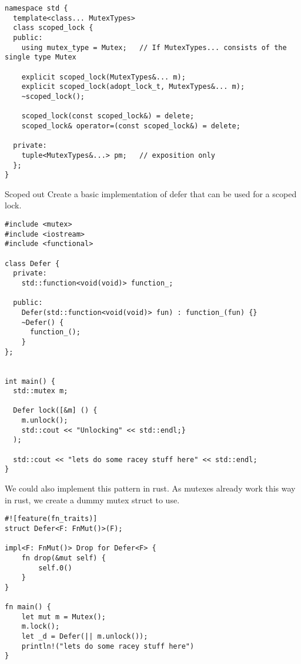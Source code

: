 \begin{verbatim}
namespace std {
  template<class... MutexTypes>
  class scoped_lock {
  public:
    using mutex_type = Mutex;   // If MutexTypes... consists of the single type Mutex
  
    explicit scoped_lock(MutexTypes&... m);
    explicit scoped_lock(adopt_lock_t, MutexTypes&... m);
    ~scoped_lock();
  
    scoped_lock(const scoped_lock&) = delete;
    scoped_lock& operator=(const scoped_lock&) = delete;
  
  private:
    tuple<MutexTypes&...> pm;   // exposition only
  };
}
\end{verbatim}

\begin{examplebox}{Scoped out}
  Create a basic implementation of defer that can be used for a scoped lock.
  \tcblower
  \begin{verbatim}
#include <mutex>
#include <iostream>
#include <functional>

class Defer {
  private:
    std::function<void(void)> function_;

  public:
    Defer(std::function<void(void)> fun) : function_(fun) {}
    ~Defer() {
      function_();
    }
};


int main() {
  std::mutex m;

  Defer lock([&m] () {
    m.unlock();
    std::cout << "Unlocking" << std::endl;}
  );

  std::cout << "lets do some racey stuff here" << std::endl;
}
  \end{verbatim}
  We could also implement this pattern in rust. As mutexes already work this way in rust, we create a dummy mutex struct to use.
  \begin{verbatim}
#![feature(fn_traits)]
struct Defer<F: FnMut()>(F);

impl<F: FnMut()> Drop for Defer<F> {
    fn drop(&mut self) {
        self.0()
    }
}

fn main() {
    let mut m = Mutex();
    m.lock();
    let _d = Defer(|| m.unlock());
    println!("lets do some racey stuff here")
}
  \end{verbatim}
\end{examplebox}

